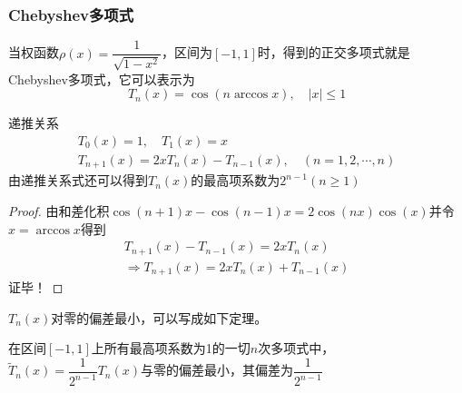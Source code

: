 \subsubsection{Chebyshev多项式}
\begin{definition}[Chebyshev多项式]
    当权函数$\rho(x) = \dfrac{1}{\sqrt{1-x^2}}$，区间为$\left[ -1,1 \right]$时，得到的正交多项式就是Chebyshev多项式，它可以表示为
    \[
        T_{n}(x) = \cos\left( n\arccos x \right),\quad |x|\leqslant 1
    \]
\end{definition}
\begin{corollary}
    递推关系
    \[
        \begin{array}{c}
            T_0(x) = 1,\quad T_{1}(x) = x\\
            T_{n+1}(x) = 2xT_{n}(x)-T_{n-1}(x),\quad (n = 1,2,\cdots,n)
        \end{array}
    \]
    由递推关系式还可以得到$T_{n}(x)$的最高项系数为$2^{n-1}(n\geqslant 1)$
\end{corollary}
\begin{proof}
    由和差化积$\cos(n+1)x-\cos(n-1)x = 2\cos(nx)\cos(x)$并令$x = \arccos x$得到
    \[
        \begin{array}{c}
            T_{n+1}(x)-T_{n-1}(x) = 2xT_{n}(x)\\
            \Rightarrow T_{n+1}(x) = 2xT_{n}(x) + T_{n-1}(x)
        \end{array}
    \]
    证毕！
\end{proof}
\begin{corollary}
    $T_{n}(x)$对零的偏差最小，可以写成如下定理。
\end{corollary}
\begin{theorem}\label{theo:Tx-0min}
    在区间$[-1,1]$上所有最高项系数为1的一切$n$次多项式中，$\widetilde{T}_{n}(x) = \dfrac{1}{2^{n-1}}T_{n}(x)$与零的偏差最小，其偏差为$\dfrac{1}{2^{n-1}}$
\end{theorem}
